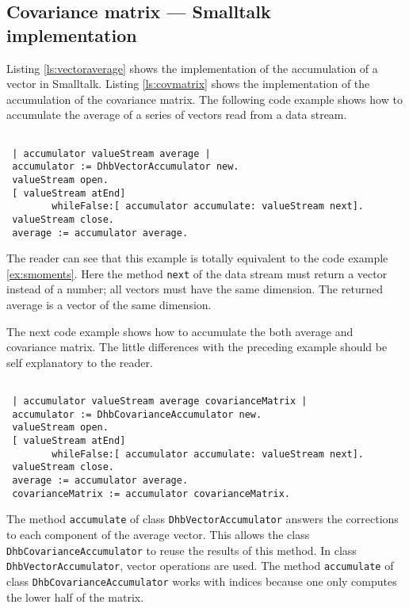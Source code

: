 \documentclass[twoside]{book}
\begin{document}
\subsection{Covariance matrix --- Smalltalk implementation}
\label{sec:scovmatrix} Listing \ref{ls:vectoraverage} shows the
implementation of the accumulation of a vector in Smalltalk.
Listing \ref{ls:covmatrix} shows the implementation of the
accumulation of the covariance matrix. The following code example
shows how to accumulate the average of a series of vectors read
from a data stream.
\begin{codeExample}
\begin{verbatim}

 | accumulator valueStream average |
 accumulator := DhbVectorAccumulator new.
 valueStream open.
 [ valueStream atEnd]
        whileFalse:[ accumulator accumulate: valueStream next].
 valueStream close.
 average := accumulator average.
\end{verbatim}
\end{codeExample}
The reader can see that this example is totally equivalent to the
code example \ref{ex:smoments}. Here the method {\tt next} of the
data stream must return a vector instead of a number; all vectors
must have the same dimension. The returned average is a vector of
the same dimension.

The next code example shows how to accumulate the both average and
covariance matrix. The little differences with the preceding
example should be self explanatory to the reader.
\begin{codeExample}
\begin{verbatim}

 | accumulator valueStream average covarianceMatrix |
 accumulator := DhbCovarianceAccumulator new.
 valueStream open.
 [ valueStream atEnd]
        whileFalse:[ accumulator accumulate: valueStream next].
 valueStream close.
 average := accumulator average.
 covarianceMatrix := accumulator covarianceMatrix.
\end{verbatim}
\end{codeExample}

The method {\tt accumulate} of class {\tt DhbVectorAccumulator}
answers the corrections to each component of the average vector.
This allows the class {\tt DhbCovarianceAccumulator} to reuse the
results of this method. In class {\tt DhbVectorAccumulator},
vector operations are used. The method {\tt accumulate} of class
{\tt DhbCovarianceAccumulator} works with indices because one only
computes the lower half of the matrix.
\end{document}
